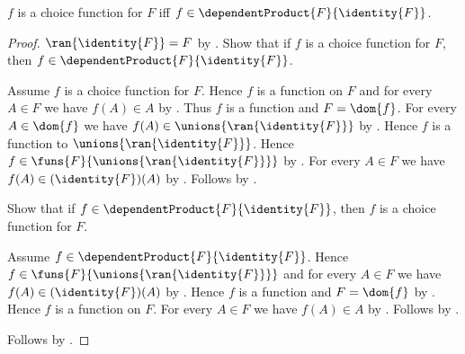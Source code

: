 \begin{theorem}\label{choice_function_iff_dependent_product}
    $f$ is a choice function for $F$ iff
        $f\in\dependentProduct{F}{\identity{F}}$.
\end{theorem}
\begin{proof}
    $\ran{\identity{F}}=F$ by .
    Show that if $f$ is a choice function for $F$, then
        $f\in\dependentProduct{F}{\identity{F}}$.
    \begin{subproof}
        Assume $f$ is a choice function for $F$.
        Hence $f$ is a function on $F$ and for every $A\in F$ we have
            $f(A)\in A$ by .
        Thus $f$ is a function and $F=\dom{f}$.
        For every $A\in\dom{f}$ we have
            $f(A)\in\unions{\ran{\identity{F}}}$ by
            .
        Hence $f$ is a function to
            $\unions{\ran{\identity{F}}}$.
        Hence $f\in\funs{F}{\unions{\ran{\identity{F}}}}$ by
            .
        For every $A\in F$ we have
            $f(A)\in(\identity{F})(A)$ by .
        Follows by .
    \end{subproof}
    Show that if $f\in\dependentProduct{F}{\identity{F}}$, then
        $f$ is a choice function for $F$.
    \begin{subproof}
        Assume $f\in\dependentProduct{F}{\identity{F}}$.
        Hence $f\in\funs{F}{\unions{\ran{\identity{F}}}}$ and
            for every $A\in F$ we have
                $f(A)\in(\identity{F})(A)$ by
            .
        Hence $f$ is a function and $F=\dom{f}$ by
            .
        Hence $f$ is a function on $F$.
        For every $A\in F$ we have $f(A)\in A$ by .
        Follows by .
    \end{subproof}
    Follows by \auto.
\end{proof}

